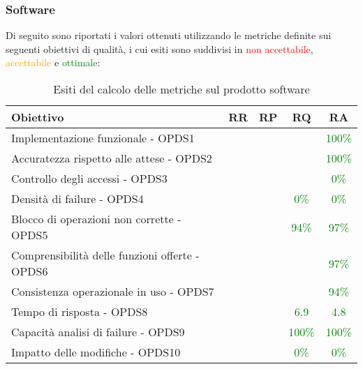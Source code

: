 \documentclass[PdQ.tex]{subfiles}
\begin{document}
	\subsubsection{Software}
	Di seguito sono riportati i valori ottenuti utilizzando le metriche definite sui seguenti obiettivi di qualità, i cui esiti sono suddivisi in \textcolor{red}{non accettabile}, \textcolor{orange}{accettabile} e \textcolor{green}{ottimale}:
	\begin{table}[H]
				\centering
				\begin{tabular}{l c c c c}
					\hline
					\rule[-0.3cm]{0cm}{0.8cm}
					\textbf{Obiettivo} & \textbf{RR} & \textbf{RP} & \textbf{RQ}& \textbf{RA}\\
					\hline
					\rule[0cm]{0cm}{0.4cm}
					Implementazione funzionale - OPDS1 & & & & \textcolor{green}{100\%} \\
					\rule[0cm]{0cm}{0.4cm}
					Accuratezza rispetto alle attese - OPDS2 & & & & \textcolor{green}{100\%} \\
					\rule[0cm]{0cm}{0.4cm}
					Controllo degli accessi - OPDS3 & & & & \textcolor{green}{0\%} \\
					\rule[0cm]{0cm}{0.4cm}
					Densità di failure - OPDS4 & & & \textcolor{green}{0\%} & \textcolor{green}{0\%} \\
					\rule[0cm]{0cm}{0.4cm}
					Blocco di operazioni non corrette - OPDS5 & & & \textcolor{green}{94\%} & \textcolor{green}{97\%}\\
					\rule[0cm]{0cm}{0.4cm}
					Comprensibilità delle funzioni offerte - OPDS6 & & & & \textcolor{green}{97\%} \\
					\rule[0cm]{0cm}{0.4cm}
					Consistenza operazionale in uso - OPDS7 & & & & \textcolor{green}{94\%} \\
					\rule[0cm]{0cm}{0.4cm}
					Tempo di risposta - OPDS8 & & & \textcolor{green}{6.9} & \textcolor{green}{4.8}\\
					\rule[0cm]{0cm}{0.4cm}
					Capacità analisi di failure - OPDS9 & & & \textcolor{green}{100\%} & \textcolor{green}{100\%}\\
					\rule[0cm]{0cm}{0.4cm}
					Impatto delle modifiche - OPDS10 & & & \textcolor{green}{0\%} & \textcolor{green}{0\%}\\
					\hline
				\end{tabular}
				\caption{Esiti del calcolo delle metriche sul prodotto software}
			\end{table}
\end{document}
